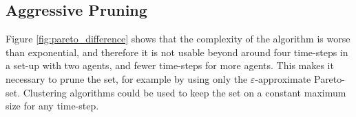 \documentclass{article}
\begin{document}
\begin{multicols}{2}
	\subsection{Aggressive Pruning}
		\label{sub:aggressive_pruning}
		Figure \ref{fig:pareto_difference} shows that the complexity of the
		algorithm is worse than exponential, and therefore it is not usable
		beyond around four time-steps in a set-up with two agents, and fewer
		time-steps for more agents. This makes it necessary to prune the set, for
		example by using only the $\varepsilon$-approximate Pareto-set.
		Clustering algorithms could be used to keep the set on a constant maximum
		size for any time-step.
	\end{multicols}

	\clearpage
	
	
\end{document}
